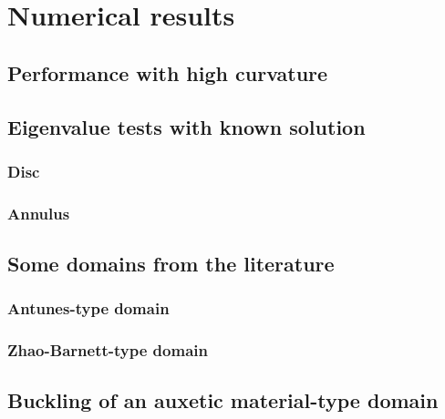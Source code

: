 
\section{Numerical results}

\subsection{Performance with high curvature}

\subsection{Eigenvalue tests with known solution}

\subsubsection{Disc}

\subsubsection{Annulus}

\subsection{Some domains from the literature}

\subsubsection{Antunes-type domain}

\subsubsection{Zhao-Barnett-type domain}

\subsection{Buckling of an auxetic material-type domain}

